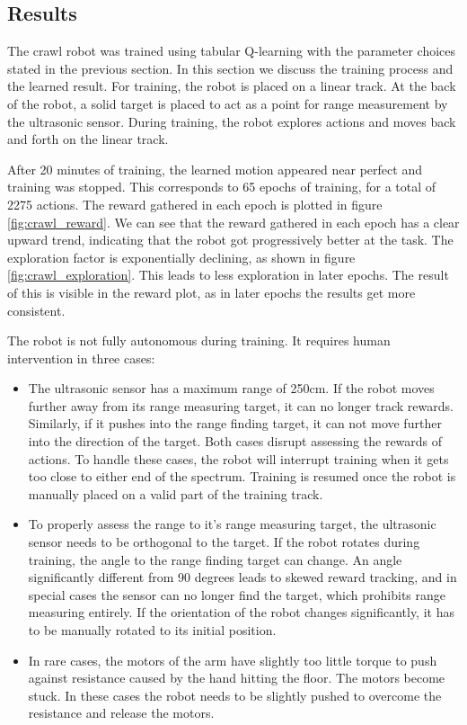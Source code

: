 \documentclass[11pt, a4paper]{article}
\begin{document}
\subsection{Results}
The crawl robot was trained using tabular Q-learning with the parameter choices stated in the previous section. In this section we discuss the training process and the learned result. For training, the robot is placed on a linear track. At the back of the robot, a solid target is placed to act as a point for range measurement by the ultrasonic sensor. During training, the robot explores actions and moves back and forth on the linear track. 

After 20 minutes of training, the learned motion appeared near perfect and training was stopped. This corresponds to 65 epochs of training, for a total of 2275 actions. The reward gathered in each epoch is plotted in figure \ref{fig:crawl_reward}. We can see that the reward gathered in each epoch has a clear upward trend, indicating that the robot got progressively better at the task. The exploration factor is exponentially declining, as shown in figure \ref{fig:crawl_exploration}. This leads to less exploration in later epochs. The result of this is visible in the reward plot, as in later epochs the results get more consistent.

The robot is not fully autonomous during training. It requires human intervention in three cases:
\begin{itemize}
	\item The ultrasonic sensor has a maximum range of 250cm. If the robot moves further away from its range measuring target, it can no longer track rewards. Similarly, if it pushes into the range finding target, it can not move further into the direction of the target. Both cases disrupt assessing the rewards of actions. To handle these cases, the robot will interrupt training when it gets too close to either end of the spectrum. Training is resumed once the robot is manually placed on a valid part of the training track.
	\item To properly assess the range to it's range measuring target, the ultrasonic sensor needs to be orthogonal to the target. If the robot rotates during training, the angle to the range finding target can change. An angle significantly different from 90 degrees leads to skewed reward tracking, and in special cases the sensor can no longer find the target, which prohibits range measuring entirely. If the orientation of the robot changes significantly, it has to be manually rotated to its initial position.
	\item In rare cases, the motors of the arm have slightly too little torque to push against resistance caused by the hand hitting the floor. The motors become stuck. In these cases the robot needs to be slightly pushed to overcome the resistance and release the motors.
\end{itemize}
\end{document}
